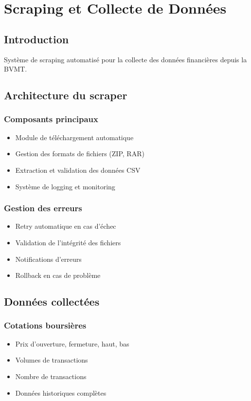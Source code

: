 \documentclass[12pt,a4paper]{article}
\begin{document}
\section{Scraping et Collecte de Données}

\subsection{Introduction}
Système de scraping automatisé pour la collecte des données financières depuis la BVMT.

\subsection{Architecture du scraper}
\subsubsection{Composants principaux}
\begin{itemize}
    \item Module de téléchargement automatique
    \item Gestion des formats de fichiers (ZIP, RAR)
    \item Extraction et validation des données CSV
    \item Système de logging et monitoring
\end{itemize}

\subsubsection{Gestion des erreurs}
\begin{itemize}
    \item Retry automatique en cas d'échec
    \item Validation de l'intégrité des fichiers
    \item Notifications d'erreurs
    \item Rollback en cas de problème
\end{itemize}

\subsection{Données collectées}
\subsubsection{Cotations boursières}
\begin{itemize}
    \item Prix d'ouverture, fermeture, haut, bas
    \item Volumes de transactions
    \item Nombre de transactions
    \item Données historiques complètes
\end{itemize}
\end{document}

